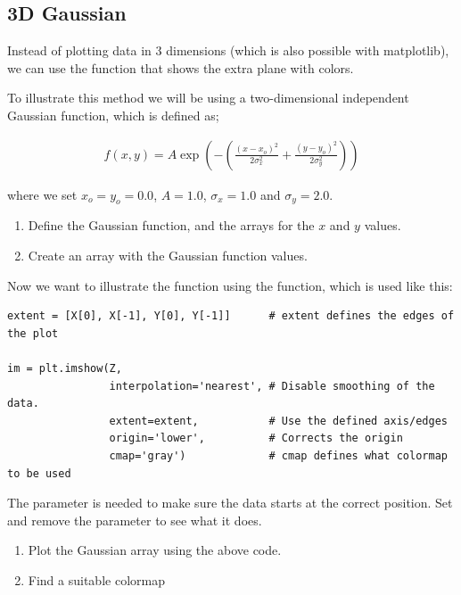 \documentclass{article}
\begin{document}
\newpage
\subsection{3D Gaussian}

Instead of plotting data in 3 dimensions (which is also possible with matplotlib), we can use the  function that shows the extra plane with colors.

To illustrate this method we will be using a two-dimensional independent Gaussian function, which is defined as;

\begin{align}
  f(x,y) = A \exp \left ( - \left ( \frac{(x - x_o)^2}{2\sigma_x^2} + \frac{(y - y_o)^2}{2\sigma_y^2} \right ) \right )
\end{align}

where we set $x_o = y_o = 0.0$, $A = 1.0$, $\sigma_x = 1.0$ and $\sigma_y = 2.0$.\\


\begin{enumerate}

    \item Define the Gaussian function, and the arrays for the $x$ and $y$ values.

    \item Create an array  with the Gaussian function values.

\end{enumerate}

Now we want to illustrate the function using the  function, which is used like this:

\begin{lstlisting}
extent = [X[0], X[-1], Y[0], Y[-1]]      # extent defines the edges of the plot

im = plt.imshow(Z,
                interpolation='nearest', # Disable smoothing of the data.
                extent=extent,           # Use the defined axis/edges
                origin='lower',          # Corrects the origin
                cmap='gray')             # cmap defines what colormap to be used
\end{lstlisting}

The  parameter is needed to make sure the data starts at the correct position.
Set  and remove the parameter to see what it does.

\begin{enumerate}[resume]

    \item Plot the Gaussian array using the above code.

    \item Find a suitable colormap

\end{enumerate}
\end{document}
